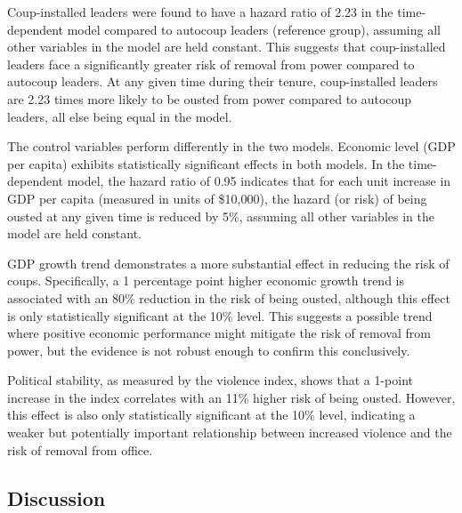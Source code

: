 \documentclass[
  12pt,
]{report}
\begin{document}
Coup-installed leaders were found to have a hazard ratio of 2.23 in the
time-dependent model compared to autocoup leaders (reference group),
assuming all other variables in the model are held constant. This
suggests that coup-installed leaders face a significantly greater risk
of removal from power compared to autocoup leaders. At any given time
during their tenure, coup-installed leaders are 2.23 times more likely
to be ousted from power compared to autocoup leaders, all else being
equal in the model.

The control variables perform differently in the two models. Economic
level (GDP per capita) exhibits statistically significant effects in
both models. In the time-dependent model, the hazard ratio of 0.95
indicates that for each unit increase in GDP per capita (measured in
units of \$10,000), the hazard (or risk) of being ousted at any given
time is reduced by 5\%, assuming all other variables in the model are
held constant.

GDP growth trend demonstrates a more substantial effect in reducing the
risk of coups. Specifically, a 1 percentage point higher economic growth
trend is associated with an 80\% reduction in the risk of being ousted,
although this effect is only statistically significant at the 10\%
level. This suggests a possible trend where positive economic
performance might mitigate the risk of removal from power, but the
evidence is not robust enough to confirm this conclusively.

Political stability, as measured by the violence index, shows that a
1-point increase in the index correlates with an 11\% higher risk of
being ousted. However, this effect is also only statistically
significant at the 10\% level, indicating a weaker but potentially
important relationship between increased violence and the risk of
removal from office.

\subsection{Discussion}\label{discussion}
\end{document}
